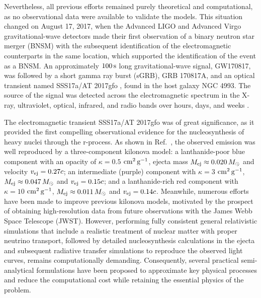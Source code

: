 Nevertheless, all previous efforts remained purely theoretical and computational, as no observational data were available to validate the models.
This situation changed on August 17, 2017, when the Advanced LIGO and Advanced Virgo gravitational-wave detectors made their first observation of a binary neutron star merger (BNSM) \cite{abbott_gw170817_2017} with the subsequent identification of the electromagnetic counterparts in the same location, which supported the identification of the event as a BNSM.
An approximately $100\,\rm s$ long gravitational-wave signal, GW170817, was followed by a short gamma ray burst (sGRB), GRB 170817A, and an optical transient named SSS17a/AT 2017gfo \cite{coulter_swope_2017}, found in the host galaxy NGC 4993.
The source of the signal was detected across the electromagnetic spectrum in the X-ray, ultraviolet, optical, infrared, and radio bands over hours, days, and weeks \cite{drout_light_2017}.

The electromagnetic transient SSS17a/AT 2017gfo was of great significance, as it provided the first compelling observational evidence for the nucleosynthesis of heavy nuclei through the r-process.
As shown in Ref.~\cite{villar_combined_2017}, the observed emission was well reproduced by a three-component kilonova model:
a lanthanide-poor blue component with an opacity of $\kappa = 0.5$ $\rm cm^{2}\,\rm g^{-1}$, ejecta mass $M_{\rm ej}\approx0.020\, M_{\odot}$ and velocity $v_{\rm ej}=0.27 c$; an intermediate (purple) component with $\kappa=3$ $\rm cm^2\,\rm g^{-1}$, $M_{\rm ej}\approx0.047\, M_{\odot}$ and $v_{\rm ej}=0.15 c$; and a lanthanide-rich red component with $\kappa=10$ $\rm cm^2\,\rm g^{-1}$, $M_{\rm ej}\approx0.011\, M_{\odot}$ and $v_{\rm ej}=0.14 c$.
Meanwhile, numerous efforts have been made to improve previous kilonova models, motivated by the prospect of obtaining high-resolution data from future observations with the James Webb Space Telescope (JWST).
However, performing fully consistent general relativistic simulations that include a realistic treatment of nuclear matter with proper neutrino transport, followed by detailed nucleosynthesis calculations in the ejecta and subsequent radiative transfer simulations to reproduce the observed light curves, remains computationally demanding.
Consequently, several practical semi-analytical formulations have been proposed to approximate key physical processes and reduce the computational cost while retaining the essential physics of the problem.

